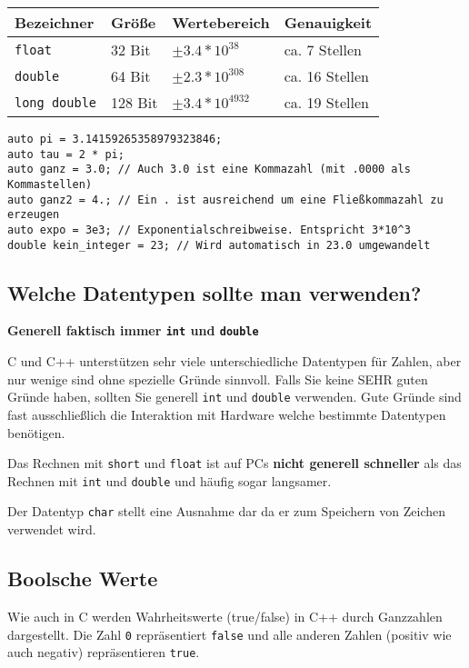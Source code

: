 \documentclass[11pt]{article}
\begin{document}
\begin{center}
\begin{tabular}{llll}
Bezeichner & Größe & Wertebereich & Genauigkeit\\
\hline
\verb~float~ & 32 Bit & $\pm3.4*10^{38}$ & ca. 7 Stellen\\
\verb~double~ & 64 Bit & $\pm2.3*10^{308}$ & ca. 16 Stellen\\
\verb~long double~ & 128 Bit & $\pm3.4*10^{4932}$ & ca. 19 Stellen\\
\end{tabular}
\end{center}

\begin{verbatim}
auto pi = 3.14159265358979323846;
auto tau = 2 * pi;
auto ganz = 3.0; // Auch 3.0 ist eine Kommazahl (mit .0000 als Kommastellen)
auto ganz2 = 4.; // Ein . ist ausreichend um eine Fließkommazahl zu erzeugen
auto expo = 3e3; // Exponentialschreibweise. Entspricht 3*10^3
double kein_integer = 23; // Wird automatisch in 23.0 umgewandelt
\end{verbatim}
\subsection{Welche Datentypen sollte man verwenden?}
\label{sec-4-3}
\textbf{Generell faktisch immer \verb~int~ und \verb~double~} 

C und C++ unterstützen sehr viele unterschiedliche Datentypen für
Zahlen, aber nur wenige sind ohne spezielle Gründe sinnvoll. Falls Sie
keine SEHR guten Gründe haben, sollten Sie generell \verb~int~ und \verb~double~
verwenden. Gute Gründe sind fast ausschließlich die Interaktion mit
Hardware welche bestimmte Datentypen benötigen.

Das Rechnen mit \verb~short~ und \verb~float~ ist auf PCs \textbf{nicht generell
schneller} als das Rechnen mit \verb~int~ und \verb~double~ und häufig sogar
langsamer.

Der Datentyp \verb~char~ stellt eine Ausnahme dar da er zum Speichern von
Zeichen verwendet wird.
\subsection{Boolsche Werte}
\label{sec-4-4}
Wie auch in C werden Wahrheitswerte (true/false) in C++ durch
Ganzzahlen dargestellt. Die Zahl \verb~0~ repräsentiert \verb~false~ und alle
anderen Zahlen (positiv wie auch negativ) repräsentieren \verb~true~.
\end{document}
